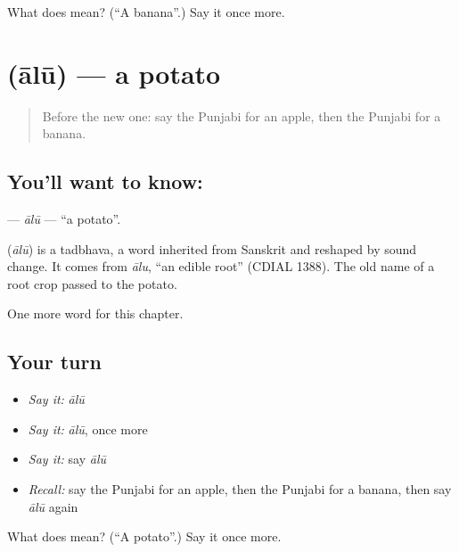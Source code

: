 \begin{tcolorbox}[breakable,colback=teal!4,colframe=teal!35!black,title={Before you move on}]
What does  mean? (\textquotedblleft{}A banana\textquotedblright{}.) Say it once more.
\end{tcolorbox}
\section[\texorpdfstring{\pa{ਆਲੂ} (ālū)}{ਆਲੂ (ālū)}]{ (ālū) — a potato}

\label{lesson:PA-C64-alu}



\begin{quote}
Before the new one: say the Punjabi for an apple, then the Punjabi for a banana.
\end{quote}

\subsection*{You'll want to know: }
\textbf{} — \emph{ālū} — \textquotedblleft{}a potato\textquotedblright{}.

\begin{cousinweb}
\textbf{} (\emph{ālū}) is a tadbhava, a word inherited from Sanskrit and reshaped by sound change. It comes from \emph{ālu}, \textquotedblleft{}an edible root\textquotedblright{} (CDIAL 1388). The old name of a root crop passed to the potato.
\end{cousinweb}

\begin{grammarlens}[title={What you've built}]
One more word for this chapter.
\end{grammarlens}

\subsection*{Your turn}
\begin{itemize}
\raggedright
  \item \emph{Say it:} \emph{ālū}
  \item \emph{Say it:} \emph{ālū}, once more
  \item \emph{Say it:} say \emph{ālū}
  \item \emph{Recall:} say the Punjabi for an apple, then the Punjabi for a banana, then say \emph{ālū} again
\end{itemize}

\begin{tcolorbox}[breakable,colback=teal!4,colframe=teal!35!black,title={Before you move on}]
What does  mean? (\textquotedblleft{}A potato\textquotedblright{}.) Say it once more.
\end{tcolorbox}
